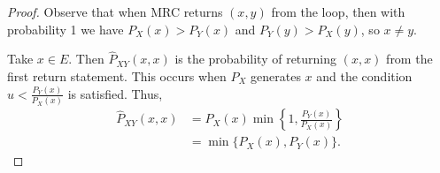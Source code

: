 \documentclass{article}
\newcommand{\mrc}{MRC\xspace}
\begin{document}
\begin{proof}
    Observe that when \mrc returns $(x,y)$ from the loop,
    then with probability 1 we have $P_X(x) > P_Y(x)$ and $P_Y(y) > P_X(y)$,
    so $x \neq y$.

    Take $x \in E$. Then $\hat{P}_{XY}(x,x)$ is the probability of returning $(x,x)$ 
    from the first return statement. This occurs when $P_X$ generates $x$ 
    and the condition $u < \frac{P_Y(x)}{P_X(x)}$ is satisfied. Thus,
    \begin{align*}
        \hat{P}_{XY}(x, x) 
        &= P_X(x) \min \left\{ 1, \frac{P_Y(x)}{P_X(x)} \right\} \\
        &= \min \{ P_X(x), P_Y(x) \}.
    \end{align*}
\end{proof}
\end{document}
